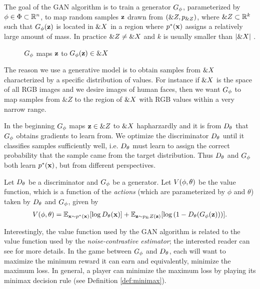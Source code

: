 The goal of the GAN algorithm is to train a generator $G_\phi$,
parameterized by $\phi \in \Phi \subset \mathbb{R}^n$, to map random samples
$\mathbf{z}$ drawn from $(\&Z, p_{\&Z})$, where $\&Z \subset \mathbb{R}^k$
such that $G_\phi(\mathbf{z})$ is located in $\&X$ in a region where $p^*(\mathbf{x})$
assigns a relatively large amount of mass. In practice
$\&Z \not = \&X$ and $k$ is usually smaller than $|\&X|$
\cite{ref:arjovsky-2017}.

\begin{figure}[H] \centering
  \caption{$G_\phi$ maps $\mathbf{z}$ to $G_\phi(\mathbf{z}) \in \&X$}
  \label{fig:g-maps}
\end{figure}

The reason we use a generative model is to obtain samples from
$\&X$ characterized by a specific distribution of values. For
instance if $\&X$ is the space of all RGB images and we desire
images of human faces, then we want $G_\phi$ to map samples from $\&Z$ to
the region of $\&X$ with RGB values within a very narrow range.

In the beginning $G_\phi$ maps $\mathbf{z} \in \&Z$ to $\&X$ hapharzardly and
it is from $D_\theta$ that $G_\phi$ obtains gradients to learn from. We optimize
the discriminator $D_\theta$ until it classifies samples sufficiently well,
i.e. $D_\theta$ must learn to assign the correct probability that the sample
came from the target distribution. Thus $D_\theta$ and $G_\phi$ both learn
$p^*(\mathbf{x})$, but from different perspectives.

Let $D_\theta$ be a discriminator and $G_\phi$ be a generator. Let $V(\phi, \theta)$ be the
value function, which is a function of the \textit{actions} (which are
parameterized by $\phi$ and $\theta$) taken by $D_\theta$ and $G_\phi$, given by
\begin{align}
  \label{eq:the-original-objective-function} V(\phi, \theta) =
  \mathbb{E}_{\mathbf{x} \sim p^*(\mathbf{x})}[{\log D_\theta(\mathbf{x}})] + \mathbb{E}_{\mathbf{z} \sim
  p_\&Z(\mathbf{z})}[\log{(1 - D_\theta(G_\phi(\mathbf{z})))}].
\end{align}

Interestingly, the value function used by the GAN algorithm is related
to the value function used by the \textit{noise-contrastive
  estimator}; the interested reader can see \cite{ref:gutmann-2010}
for more details. In the game between $G_\phi$ and $D_\theta$, each will want to
maximize the minimum reward it can earn and equivalently, minimize the
maximum loss. In general, a player can minimize the maximum loss by
playing its minimax decision rule (see Definition \ref{def:minimax}).

